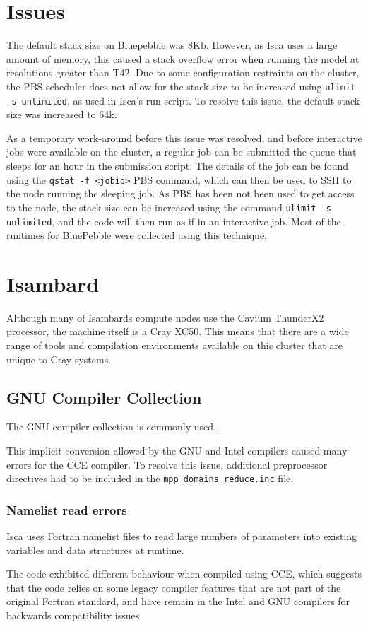 \documentclass[a4paper,11pt]{report}
\begin{document}
\section{Issues}
The default stack size on Bluepebble was 8Kb. However, as Isca uses a large amount of memory, this caused a stack overflow error when running the model at resolutions greater than T42. Due to some configuration restraints on the cluster, the PBS scheduler does not allow for the stack size to be increased using \texttt{ulimit -s unlimited}, as used in Isca's run script. To resolve this issue, the default stack size was increased to 64k.
\par
As a temporary work-around before this issue was resolved, and before interactive jobs were available on the cluster, a regular job can be submitted the queue that sleeps for an hour in the submission script. The details of the job can be found using the  \texttt{qstat -f <jobid>} PBS command, which can then be used to SSH to the node running the sleeping job. As PBS has been not been used to get access to the node, the stack size can be increased using the command \texttt{ulimit -s unlimited}, and the code will then run as if in an interactive job. Most of the runtimes for BluePebble were collected using this technique. 


\section{Isambard}
Although many of Isambards compute nodes use the Cavium ThunderX2 processor, the machine itself is a Cray XC50. This means that there are a wide range of tools and compilation environments available on this cluster that are unique to Cray systems. 


\subsection{GNU Compiler Collection}
The GNU compiler collection is commonly used... 






\par
This implicit conversion allowed by the GNU and Intel compilers caused many errors for the CCE compiler. To resolve this issue, additional preprocessor directives had to be included in the \texttt{mpp\_domains\_reduce.inc} file. 

\subsubsection{Namelist read errors}
Isca uses Fortran namelist files to read large numbers of parameters into existing variables and data structures at runtime. 
\par
The code exhibited different behaviour when compiled using CCE, which suggests that the code relies on some legacy compiler features that are not part of the original Fortran standard, and have remain in the Intel and GNU compilers for backwards compatibility issues. 
\end{document}
